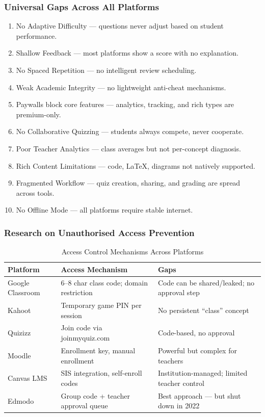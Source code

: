 \documentclass[12pt,a4paper]{article}
\newcommand{\yes}{\textcolor{accent}{\ding{51}}}   %
\begin{document}
\subsubsection{Universal Gaps Across All Platforms}

\begin{enumerate}[leftmargin=1.5em]
  \item No Adaptive Difficulty --- questions never adjust based on student performance.
  \item Shallow Feedback --- most platforms show a score with no explanation.
  \item No Spaced Repetition --- no intelligent review scheduling.
  \item Weak Academic Integrity --- no lightweight anti-cheat mechanisms.
  \item Paywalls block core features --- analytics, tracking, and rich types are premium-only.
  \item No Collaborative Quizzing --- students always compete, never cooperate.
  \item Poor Teacher Analytics --- class averages but not per-concept diagnosis.
  \item Rich Content Limitations --- code, \LaTeX{}, diagrams not natively supported.
  \item Fragmented Workflow --- quiz creation, sharing, and grading are spread across tools.
  \item No Offline Mode --- all platforms require stable internet.
\end{enumerate}

\subsubsection{Research on Unauthorised Access Prevention}

\begin{table}[H]
  \centering
  \caption{Access Control Mechanisms Across Platforms}
  \small
  \begin{tabularx}{\linewidth}{@{} l l X @{}}
    \toprule
    \textbf{Platform} & \textbf{Access Mechanism} & \textbf{Gaps} \\
    \midrule
    Google Classroom & 6--8 char class code; domain restriction & Code can be shared/leaked; no approval step \\
    Kahoot           & Temporary game PIN per session           & No persistent ``class'' concept \\
    Quizizz          & Join code via joinmyquiz.com            & Code-based, no approval \\
    Moodle           & Enrollment key, manual enrollment       & Powerful but complex for teachers \\
    Canvas LMS       & SIS integration, self-enroll codes      & Institution-managed; limited teacher control \\
    Edmodo           & Group code + teacher approval queue     & \yes Best approach --- but shut down in 2022 \\
    \bottomrule
  \end{tabularx}
\end{table}
\end{document}
